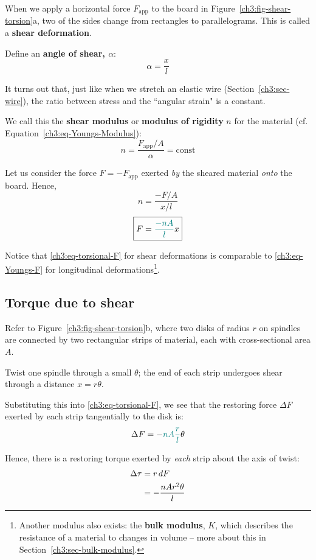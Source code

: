 When we apply a horizontal force $F_\text{app}$ to the board in Figure~\ref{ch3:fig-shear-torsion}a, two of the sides change from rectangles to parallelograms. This is called a \textbf{shear deformation}.

Define an \textbf{angle of shear, $\alpha$}:
\[ \alpha = \frac{x}{l} \]

It turns out that, just like when we stretch an elastic wire (Section~\ref{ch3:sec-wire}), the ratio between stress and the ``angular strain" is a constant.

We call this the \textbf{shear modulus} or \textbf{modulus of rigidity} $n$ for the material (cf. Equation~\ref{ch3:eq-Youngs-Modulus}):
\[  n= \frac{F_\text{app}/A}{\alpha} = \text{const} \]

Let us consider the force $F=-F_\text{app}$ exerted \emph{by} the sheared material \emph{onto} the board. Hence,
\[  n = \frac{-F/A}{x/l} \]
\begin{equation}
	\boxed{F = \textcolor{teal}{\frac{-nA}{l}} x}  \label{ch3:eq-torsional-F}
\end{equation}

Notice that \eqref{ch3:eq-torsional-F} for {shear deformations} is comparable to \eqref{ch3:eq-Youngs-F} for {longitudinal deformations}\footnote{Another modulus also exists: the \textbf{bulk modulus}, $K$, which describes the resistance of a material to changes in volume -- more about this in Section~\ref{ch3:sec-bulk-modulus}.}.

\subsection{Torque due to shear}
Refer to Figure~\ref{ch3:fig-shear-torsion}b, where two disks of radius $r$ on spindles are connected by two rectangular strips of material, each with cross-sectional area $A$.

Twist one spindle through a small $\theta$; the end of each strip undergoes shear through a distance $x=r\theta$. 

Substituting this into \eqref{ch3:eq-torsional-F}, we see that the restoring force $\Delta F$ exerted by each strip tangentially to the disk is:
\[ \Delta F = -\textcolor{teal}{nA\frac{r}{l}} \theta \]

Hence, there is a restoring torque exerted by \emph{each} strip about the axis of twist:
\begin{align*}
	\Delta\tau &= r\,dF  \notag \\
	&= -\frac{nAr^2\theta}{l} 
\end{align*}

